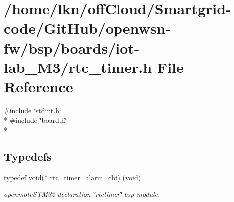 \hypertarget{iot-lab___m3_2rtc__timer_8h}{}\section{/home/lkn/off\+Cloud/\+Smartgrid-\/code/\+Git\+Hub/openwsn-\/fw/bsp/boards/iot-\/lab\+\_\+\+M3/rtc\+\_\+timer.h File Reference}
\label{iot-lab___m3_2rtc__timer_8h}
{\ttfamily \#include \char`\"{}stdint.\+h\char`\"{}}\\*
{\ttfamily \#include \char`\"{}board.\+h\char`\"{}}\\*
\subsection*{Typedefs}
\begin{DoxyCompactItemize}
\item 
typedef \hyperlink{usb__devapi_8h_afabf60e7f57651d6d595a02c75f07cd0}{void}($\ast$ \hyperlink{iot-lab___m3_2rtc__timer_8h_a3854a3297c7095644b61891e55d5e717}{rtc\+\_\+timer\+\_\+alarm\+\_\+cbt}) (\hyperlink{usb__devapi_8h_afabf60e7f57651d6d595a02c75f07cd0}{void})
\begin{DoxyCompactList}\small\item\em openmote\+S\+T\+M32 declaration \char`\"{}rtctimer\char`\"{} bsp module. \end{DoxyCompactList}\end{DoxyCompactItemize}
